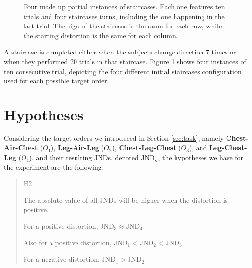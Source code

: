 \begin{figure}[h]
    \caption{Four made up partial instances of staircases. Each one features ten trials and four staircases turns, including the one happening in the last trial. The sign of the staircase is the same for each row, while the starting distortion is the same for each column.}\label{fig:trials}
\end{figure}

A staircase is completed either when the subjects change direction 7 times or when they performed 20 trials in that staircase. Figure \ref{fig:trials} shows four instances of ten consecutive trial, depicting the four different initial staircases configuration used for each possible target order.

\section{Hypotheses}

Considering the target orders we introduced in Section \ref{sec:task}, namely \textbf{Chest-Air-Chest} ($O_1$), \textbf{Leg-Air-Leg} ($O_2$), \textbf{Chest-Leg-Chest} ($O_3$), and \textbf{Leg-Chest-Leg} ($O_4$), and their resulting JNDs, denoted $\text{JND}_n$, the hypotheses we have for the experiment are the following:

\begin{quote}
    \begin{labeling}[:]{H2}
      \item [H1] The absolute value of all JNDs will be higher when the distortion is positive.
      \item [H2] For a positive distortion, $\text{JND}_3 \approx \text{JND}_4$
      \item [H3] Also for a positive distortion, $\text{JND}_1 < \text{JND}_2 < \text{JND}_3$
      \item [H4] For a negative distortion, $\text{JND}_1 > \text{JND}_2$
    \end{labeling}
\end{quote}

